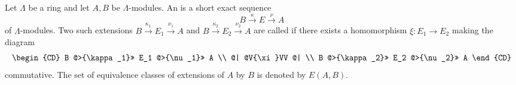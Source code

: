 Let $\Lambda$ be a ring and let $A, B$ be $\Lambda$-modules. An  is a short exact sequence
$$
B \xrightarrow{\kappa} E \xrightarrow{\nu} A
$$
of $\Lambda$-modules. Two such extensions $B \xrightarrow{\kappa_1} E_1 \xrightarrow{\nu_1} A$ and $B \xrightarrow{\kappa_2} E_2 \xrightarrow{\nu_2} A$ are called  if there exists a homomorphism $\xi: E_1 \to E_2$ making the diagram
$$
\begin{CD}
B @>{\kappa_1}>> E_1 @>{\nu_1}>> A \\
@| @V{\xi}VV @| \\
B @>{\kappa_2}>> E_2 @>{\nu_2}>> A
\end{CD}
$$
commutative. The set of equivalence classes of extensions of $A$ by $B$ is denoted by $E(A, B)$.
